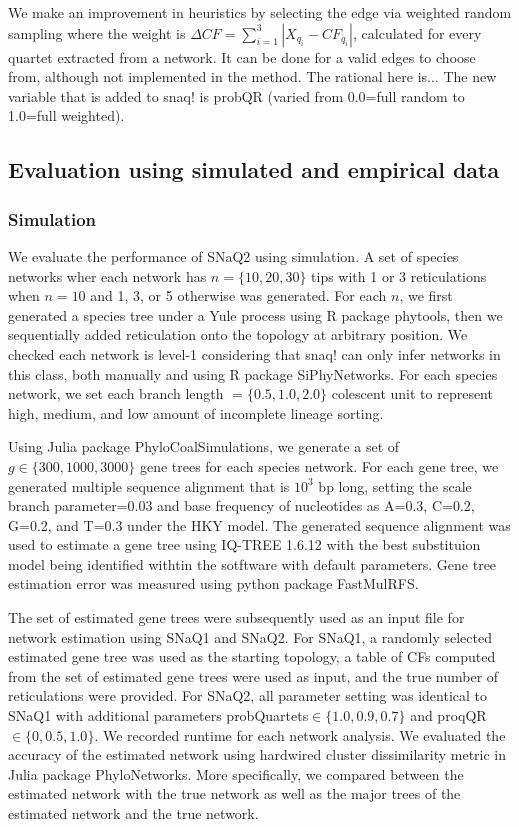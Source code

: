 \documentclass[unnumsec,webpdf,contemporary,large]{oup-authoring-template}%
\theoremstyle{thmstyleone}%
\theoremstyle{thmstyletwo}%
\theoremstyle{thmstylethree}%
\begin{document}
We make an improvement in heuristics by selecting the edge via weighted random sampling where the weight is $\Delta CF=\sum^3_{i=1}\left|X_{q_i}-CF_{q_i}\right|$, calculated for every quartet extracted from a network. It can be done for a valid edges to choose from, although not implemented in the method. The rational here is... The new variable that is added to snaq! is probQR (varied from 0.0=full random to 1.0=full weighted).






\subsection{Evaluation using simulated and empirical data}\label{subsec3}
\subsubsection{Simulation}
We evaluate the performance of SNaQ2 using simulation. A set of species networks wher each network has $n=\{10, 20, 30\}$ tips with 1 or 3 reticulations when $n=10$ and 1, 3, or 5 otherwise was generated. For each $n$, we first generated a species tree under a Yule process using R package phytools, then we sequentially added reticulation onto the topology at arbitrary position. We checked each network is level-1 considering that snaq! can only infer networks in this class, both manually and using R package SiPhyNetworks. For each species network, we set each branch length $=\{0.5,1.0,2.0\}$ colescent unit to represent high, medium, and low amount of incomplete lineage sorting.

Using Julia package PhyloCoalSimulations, we generate a set of $g\in\{300, 1000, 3000\}$ gene trees for each species network. For each gene tree, we generated multiple sequence alignment that is $10^3$ bp long, setting the scale branch parameter=0.03 and base frequency of nucleotides as A=0.3, C=0.2, G=0.2, and T=0.3 under the HKY model. The generated sequence alignment was used to estimate a gene tree using IQ-TREE 1.6.12 with the best substituion model being identified withtin the sotftware with default parameters. Gene tree estimation error was measured using python package FastMulRFS.

The set of estimated gene trees were subsequently used as an input file for network estimation using SNaQ1 and SNaQ2. For SNaQ1, a randomly selected estimated gene tree was used as the starting topology, a table of CFs computed from the set of estimated gene trees were used as input, and the true number of reticulations were provided. For SNaQ2, all parameter setting was identical to SNaQ1 with additional parameters probQuartets$\in\{1.0, 0.9, 0.7\}$ and proqQR$\in\{0,0.5,1.0\}$. We recorded runtime for each network analysis. We evaluated the accuracy of the estimated network using hardwired cluster dissimilarity metric in Julia package PhyloNetworks. More specifically, we compared between the estimated network with the true network as well as the major trees of the estimated network and the true network. 
\end{document}
